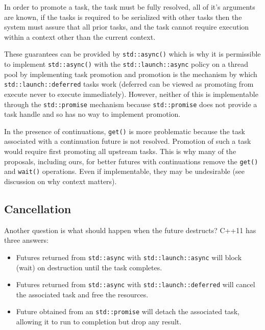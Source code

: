 In order to promote a task, the task must be fully resolved, all of it’s arguments are known, if the tasks is required to be serialized with other tasks then the system must assure that all prior tasks, and the task cannot require execution within a context other than the current context.

These guarantees can be provided by \texttt{std::async()} which is why it is permissible to implement \texttt{std::async()} with the \texttt{std::launch::async} policy on a thread pool by implementing task promotion and promotion is the mechanism by which \texttt{std::launch::deferred} tasks work (deferred can be viewed as promoting from execute never to execute immediately). However, neither of this is implementable through the \texttt{std::promise} mechanism because \texttt{std::promise} does not provide a task handle and so has no way to implement promotion.

In the presence of continuations, \texttt{get()} is more problematic because the task associated with a continuation future is not resolved. Promotion of such a task would require first promoting all upstream tasks. This is why many of the proposals, including ours, for better futures with continuations remove the \texttt{get()} and \texttt{wait()} operations. Even if implementable, they may be undesirable (see discussion on why context matters).

\subsection{Cancellation}

Another question is what should happen when the future destructs? C++11 has three answers:

\begin{itemize}
\item Futures returned from \texttt{std::async} with \texttt{std::launch::async} will block (wait) on destruction until the task completes.
\item Futures returned from \texttt{std::async} with \texttt{std::launch::deferred} will cancel the associated task and free the resources.
\item Future obtained from an \texttt{std::promise} will detach the associated task, allowing it to run to completion but drop any result.
\end{itemize}

